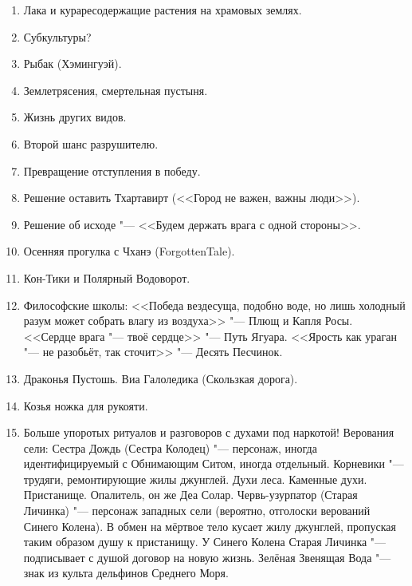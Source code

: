 \begin{enumerate}
\item Лака и кураресодержащие растения на храмовых землях.

\item Субкультуры?

\item Рыбак (Хэмингуэй).

\item Землетрясения, смертельная пустыня.

\item Жизнь других видов.

\item Второй шанс разрушителю.

\item Превращение отступления в победу.

\item Решение оставить Тхартавирт (<<Город не важен, важны люди>>).

\item Решение об исходе "--- <<Будем держать врага с одной стороны>>.

\item Осенняя прогулка с Чханэ (ForgottenTale).

\item Кон-Тики и Полярный Водоворот.

\item Философские школы: <<Победа вездесуща, подобно воде, но лишь холодный разум может собрать влагу из воздуха>> "--- Плющ и Капля Росы.
<<Сердце врага "--- твоё сердце>> "--- Путь Ягуара.
<<Ярость как ураган "--- не разобьёт, так сточит>> "--- Десять Песчинок.

\item Драконья Пустошь.
Виа Галоледика (Скользкая дорога).

\item Козья ножка для рукояти.

\item Больше упоротых ритуалов и разговоров с духами под наркотой!
Верования сели: Сестра Дождь (Сестра Колодец) "--- персонаж, иногда идентифицируемый с Обнимающим Ситом, иногда отдельный.
Корневики "--- трудяги, ремонтирующие жилы джунглей.
Духи леса.
Каменные духи.
Пристанище.
Опалитель, он же Деа Солар.
Червь-узурпатор (Старая Личинка) "--- персонаж западных сели (вероятно, отголоски верований Синего Колена).
В обмен на мёртвое тело кусает жилу джунглей, пропуская таким образом душу к пристанищу.
У Синего Колена Старая Личинка "--- подписывает с душой договор на новую жизнь.
Зелёная Звенящая Вода "--- знак из культа дельфинов Среднего Моря.


\end{enumerate}
